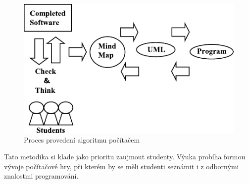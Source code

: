 \documentclass[FP,DP]{tulthesis}
\begin{document}
{{{{{{{\begin{description}
\begin{figure}[ht]
    \centering
    \includegraphics[scale=1.2]{agile.pdf}
\caption{Proces provedení algoritmu počítačem \citep[s.~56]{spirit}} \label{provedeni}
\end{figure}

\item [Game first] Tato metodika si klade jako prioritu zaujmout studenty. Výuka probíha formou vývoje počítačové hry, při kterém by se měli studenti seznámit i z odbornými znalostmi programování.
\end{description}

}}}}}}}
\end{document}
